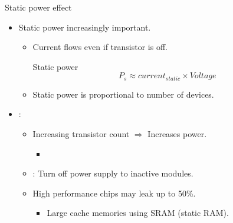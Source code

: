 \begin{frame}[t]{Static power effect}
\begin{itemize}
  \item Static power increasingly important.
    \begin{itemize}
      \item Current flows even if transistor is off.

\pause
\begin{block}{Static power}
\begin{displaymath}
P_s \approx current_{static} \times Voltage
\end{displaymath}
\end{block}

      \pause
      \item Static power is proportional to number of devices.
    \end{itemize}

  \item {}:
    \begin{itemize}
      \item Increasing transistor count $\Rightarrow$ Increases power.
        \begin{itemize}
          \item {}
        \end{itemize}

      \pause
      \item {}: Turn off power supply to inactive modules.

      \pause
      \item High performance chips may leak up to 50\%.
        \begin{itemize}
          \item Large cache memories using SRAM (static RAM).
        \end{itemize}
    \end{itemize}
\end{itemize}
\end{frame}
